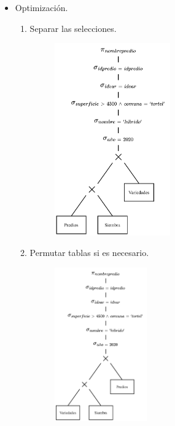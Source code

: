 \documentclass{templateNote}
\begin{document}
\begin{enumerate}
\begin{itemize}
        \item Optimizaci\'on.
        \begin{enumerate}
            \item Separar las selecciones.
            \begin{figure}[H]
                \centering
                \includegraphics[width=0.5\textwidth]{img/E2-Paso-1.png}
            \end{figure}

            \newpage
            \item Permutar tablas si es necesario.
            \begin{figure}[H]
                \centering
                \includegraphics[width=0.4\textwidth]{img/E2-Paso-2.png}
            \end{figure}


\end{enumerate}
\end{itemize}
\end{enumerate}
\end{document}
